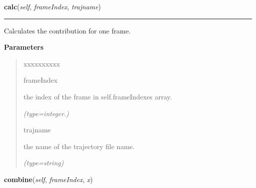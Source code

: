 \hspace{.8\funcindent}\begin{boxedminipage}{\funcwidth}

    \raggedright \textbf{calc}(\textit{self}, \textit{frameIndex}, \textit{trajname})

    \vspace{-1.5ex}

    \rule{\textwidth}{0.5\fboxrule}
\setlength{\parskip}{2ex}
    Calculates the contribution for one frame.

\setlength{\parskip}{1ex}
      \textbf{Parameters}
      \vspace{-1ex}

      \begin{quote}
        \begin{Ventry}{xxxxxxxxxx}

          \item[frameIndex]

          the index of the frame in {\textbar}self.frameIndexes{\textbar} 
          array.

            {\it (type=integer.)}

          \item[trajname]

          the name of the trajectory file name.

            {\it (type=string)}

        \end{Ventry}

      \end{quote}

    \end{boxedminipage}

    \label{nMOLDYN:Analysis:Scattering:SmoothedStaticCoherentStructureFactor:combine}

    \vspace{0.5ex}

\hspace{.8\funcindent}\begin{boxedminipage}{\funcwidth}

    \raggedright \textbf{combine}(\textit{self}, \textit{frameIndex}, \textit{x})

\setlength{\parskip}{2ex}
\setlength{\parskip}{1ex}
    \end{boxedminipage}

